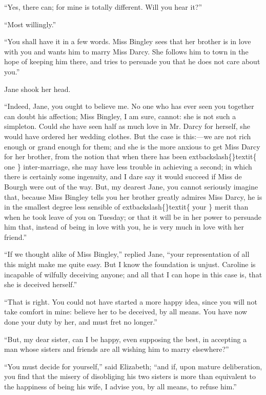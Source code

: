 \documentclass[10pt]{book}
\begin{document}
   “Yes, there can; for mine is totally different. Will you hear it?”
  

   “Most willingly.”
  

   “You shall have it in a few words. Miss Bingley sees that her brother is
in love with you and wants him to marry Miss Darcy. She follows him to
town in the hope of keeping him there, and tries to persuade you that he
does not care about you.”
  

   Jane shook her head.
  

   “Indeed, Jane, you ought to believe me. No one who has ever seen you
together can doubt his affection; Miss Bingley, I am sure, cannot: she
is not such a simpleton. Could she have seen half as much love in Mr.
Darcy for herself, she would have ordered her wedding clothes. But the
case is this:—we are not rich enough or grand enough for them; and she
is
   the more anxious to get Miss Darcy for her brother, from the notion
that when there has been
   	extbackslash\{\}textit\{
    one
   \}
   inter-marriage, she may have less trouble
in achieving a second; in which there is certainly some ingenuity, and I
dare say it would succeed if Miss de Bourgh were out of the way. But, my
dearest Jane, you cannot seriously imagine that, because Miss Bingley
tells you her brother greatly admires Miss Darcy, he is in the smallest
degree less sensible of
   	extbackslash\{\}textit\{
    your
   \}
   merit than when he took leave of you on
Tuesday; or that it will be in her power to persuade him that, instead
of being in love with you, he is very much in love with her friend.”
  

   “If we thought alike of Miss Bingley,” replied Jane, “your
representation of all this might make me quite easy. But I know the
foundation is unjust. Caroline is incapable of wilfully deceiving
anyone; and all that I can hope in this case is, that she is deceived
herself.”
  

   “That is right. You could not have started a more happy idea, since you
will not take comfort in mine: believe her to be deceived, by all means.
You have now done your duty by her, and must fret no longer.”
  

   “But, my dear sister, can I be happy, even supposing the best, in
accepting a man whose sisters and friends are all wishing him to marry
elsewhere?”
  

   “You must decide for yourself,” said Elizabeth; “and if, upon mature
deliberation, you find that the misery of disobliging his two sisters is
more than equivalent to the happiness of being his wife, I advise you,
by all means, to refuse him.”
  
\end{document}
